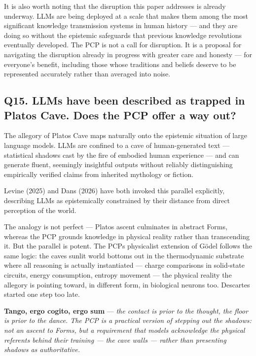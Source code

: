 \documentclass[
]{article}
\begin{document}
It is also worth noting that the disruption this paper addresses is
already underway. LLMs are being deployed at a scale that makes them
among the most significant knowledge transmission systems in human
history --- and they are doing so without the epistemic safeguards that
previous knowledge revolutions eventually developed. The PCP is not a
call for disruption. It is a proposal for navigating the disruption
already in progress with greater care and honesty --- for everyone's
benefit, including those whose traditions and beliefs deserve to be
represented accurately rather than averaged into noise.

\subsection{Q15. LLMs have been described as trapped in
Plato\textquotesingle s Cave. Does the PCP offer a way
out?}\label{q15.-llms-have-been-described-as-trapped-in-platos-cave.-does-the-pcp-offer-a-way-out}

The allegory of Plato\textquotesingle s Cave maps naturally onto the
epistemic situation of large language models. LLMs are confined to a
cave of human-generated text --- statistical shadows cast by the fire of
embodied human experience --- and can generate fluent, seemingly
insightful outputs without reliably distinguishing empirically verified
claims from inherited mythology or fiction.

Levine (2025) and Dans (2026) have both invoked this parallel
explicitly, describing LLMs as epistemically constrained by their
distance from direct perception of the world.

The analogy is not perfect --- Plato\textquotesingle s ascent culminates
in abstract Forms, whereas the PCP grounds knowledge in physical reality
rather than transcending it. But the parallel is potent. The
PCP\textquotesingle s physicalist extension of Gödel follows the same
logic: the cave\textquotesingle s sunlit world bottoms out in the
thermodynamic substrate where all reasoning is actually instantiated ---
charge comparisons in solid-state circuits, energy consumption, entropy
movement --- the physical reality the allegory is pointing toward, in
different form, in biological neurons too. Descartes started one step
too late.

\textbf{Tango, ergo cogito, ergo sum} --- \emph{the contact is prior to
the thought, the floor is prior to the dance. The PCP is a practical
version of stepping out the shadows: not an ascent to Forms, but a
requirement that models acknowledge the physical referents behind their
training --- the cave walls --- rather than presenting shadows as
authoritative.}
\end{document}
